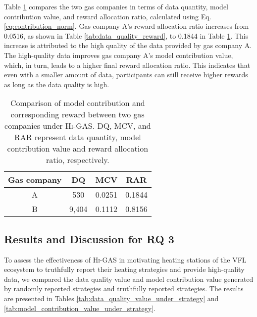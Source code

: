 \documentclass{article}
\newcommand{\methodname}{\textsc{Hi-GAS}}
\begin{document}
Table \ref{tab:model_contribution_reward} compares the two gas companies in terms of data quantity, model contribution value, and reward allocation ratio, calculated using Eq. \eqref{eq:contribution_norm}.  
Gas company A's reward allocation ratio increases from 0.0516, as shown in Table \ref{tab:data_quality_reward}, to 0.1844 in Table \ref{tab:model_contribution_reward}. This increase is attributed to the high quality of the data provided by gas company A. The high-quality data improves gas company A's model contribution value, which, in turn, leads to a higher final reward allocation ratio. This indicates that even with a smaller amount of data, participants can still receive higher rewards as long as the data quality is high.

\begin{table}[t!]
\centering
\caption{Comparison of model contribution and corresponding reward between two gas companies under \methodname{}. DQ, MCV, and RAR represent data quantity, model contribution value and reward allocation ratio, respectively.}
\begin{tabular}{|*{4}{c|}}
\hline
Gas company    & DQ & MCV & RAR \\\hline
A  & 530  &  0.0251 & 0.1844 \\\hline
B  & 9,404 &  0.1112 & 0.8156\\\hline
\end{tabular}
\label{tab:model_contribution_reward}
\end{table}

\subsection{Results and Discussion for RQ 3}
To assess the effectiveness of \methodname{} in motivating heating stations of the VFL ecosystem to truthfully report their heating strategies and provide high-quality data, we compared the data quality value and model contribution value generated by randomly reported strategies and truthfully reported strategies. The results are presented in Tables \ref{tab:data_quality_value_under_strategy} and \ref{tab:model_contribution_value_under_strategy}.
\end{document}
